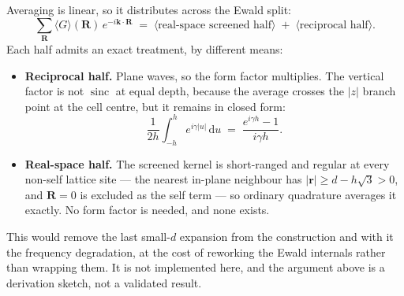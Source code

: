 \documentclass[11pt,a4paper]{article}
\newcommand{\dd}{\mathrm{d}}
\newcommand{\avg}[1]{\langle #1 \rangle}
\begin{document}
Averaging is linear, so it distributes across the Ewald split:
%
\begin{equation}
  \sum_{\bm{R}} \avg{G}(\bm{R})\,e^{-i\bm{k}\cdot\bm{R}}
  \;=\; \avg{\text{real-space screened half}} \;+\; \avg{\text{reciprocal half}} .
\end{equation}
%
Each half admits an exact treatment, by different means:

\begin{itemize}[leftmargin=2em]
\item \textbf{Reciprocal half.} Plane waves, so the form factor multiplies. The
  vertical factor is not $\operatorname{sinc}$ at equal depth, because the
  average crosses the $|z|$ branch point at the cell centre, but it remains in
  closed form:
  \begin{equation}
    \frac{1}{2h}\int_{-h}^{h} e^{i\gamma|u|}\,\dd u
      \;=\; \frac{e^{i\gamma h}-1}{i\gamma h}.
  \end{equation}
\item \textbf{Real-space half.} The screened kernel is short-ranged and regular
  at every non-self lattice site --- the nearest in-plane neighbour has
  $|\bm r| \ge d - h\sqrt{3} > 0$, and $\bm R = 0$ is excluded as the self term
  --- so ordinary quadrature averages it exactly. No form factor is needed, and
  none exists.
\end{itemize}

This would remove the last small-$d$ expansion from the construction and with it
the frequency degradation, at the cost of reworking the Ewald internals rather
than wrapping them. It is not implemented here, and the argument above is a
derivation sketch, not a validated result.
\end{document}
